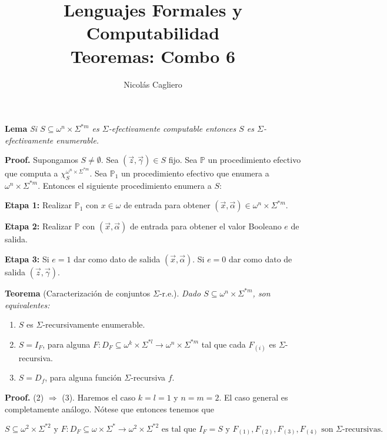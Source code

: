 \documentclass{article}
\title{Lenguajes Formales y Computabilidad \\
        \large Teoremas: Combo 6 }
\author{Nicolás Cagliero}
\begin{document}
\maketitle

\textbf{Lema} \textit{Si $S \subseteq \omega^n \times \Sigma^{*m}$ es $\Sigma$-efectivamente computable entonces $S$ es $\Sigma$-efectivamente enumerable.}
\bigskip

\textbf{Proof.} Supongamos $S \neq \emptyset$. Sea $(\vec{z}, \vec{\gamma}) \in S$ fijo. Sea $\mathbb{P}$ un procedimiento efectivo que computa a $\chi_S^{\omega^n \times \Sigma^{*m}}$. Sea $\mathbb{P}_1$ un procedimiento efectivo que enumera a $\omega^n \times \Sigma^{*m}$. Entonces el siguiente procedimiento enumera a $S$:
\medskip

\textbf{Etapa 1:} Realizar $\mathbb{P}_1$ con $x \in \omega$ de entrada para obtener $(\vec{x}, \vec{\alpha}) \in \omega^n \times \Sigma^{*m}$.

\textbf{Etapa 2:} Realizar $\mathbb{P}$ con $(\vec{x}, \vec{\alpha})$ de entrada para obtener el valor Booleano $e$ de salida.

\textbf{Etapa 3:} Si $e = 1$ dar como dato de salida $(\vec{x}, \vec{\alpha})$. Si $e = 0$ dar como dato de salida $(\vec{z}, \vec{\gamma})$.
\bigskip
\bigskip

\textbf{Teorema} (Caracterización de conjuntos $\Sigma$-r.e.). \textit{Dado $S \subseteq \omega^n \times \Sigma^{*m}$, son equivalentes:}

\begin{enumerate}
    \item $S$ es $\Sigma$-recursivamente enumerable.
    \item $S = I_F$, para alguna $F : D_F \subseteq \omega^k \times \Sigma^{*l} \to \omega^n \times \Sigma^{*m}$ tal que cada $F_{(i)}$ es $\Sigma$-recursiva.
    \item $S = D_f$, para alguna función $\Sigma$-recursiva $f$.
\end{enumerate}

\textbf{Proof.} (2) $\Rightarrow$ (3). Haremos el caso \( k = l = 1 \) y \( n = m = 2 \). El caso general es completamente análogo. Nótese que entonces tenemos que 

\begin{center}
    $S \subseteq \omega^2 \times \Sigma^{*2} \text{ y } F : D_F \subseteq \omega \times \Sigma^* \to \omega^2 \times \Sigma^{*2} \text{ es tal que } 
    I_F = S \text{ y } F_{(1)}, F_{(2)}, F_{(3)}, F_{(4)} \text{ son } \Sigma\text{-recursivas.} 
    $
\end{center}
\end{document}
